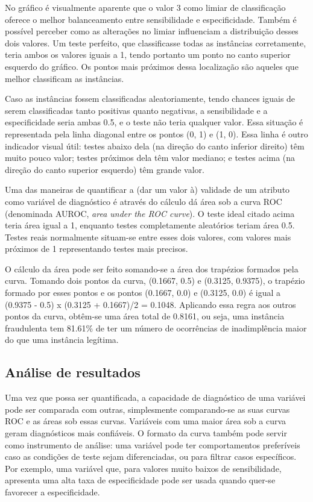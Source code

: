 No gráfico é visualmente aparente que o valor 3 como limiar de classificação oferece o melhor balanceamento entre sensibilidade e especificidade. Também é possível perceber como as alterações no limiar influenciam a distribuição desses dois valores. Um teste perfeito, que classificasse todas as instâncias corretamente, teria ambos os valores iguais a 1, tendo portanto um ponto no canto superior esquerdo do gráfico. Os pontos mais próximos dessa localização são aqueles que melhor classificam as instâncias.

Caso as instâncias fossem classificadas aleatoriamente, tendo chances iguais de serem classificadas tanto positivas quanto negativas, a sensibilidade e a especificidade seria ambas 0.5, e o teste não teria qualquer valor. Essa situação é representada pela linha diagonal entre os pontos (0, 1) e (1, 0). Essa linha é outro indicador visual útil: testes abaixo dela (na direção do canto inferior direito) têm muito pouco valor; testes próximos dela têm valor mediano; e testes acima (na direção do canto superior esquerdo) têm grande valor.

Uma das maneiras de quantificar a (dar um valor à) validade de um atributo como variável de diagnóstico é através do cálculo dá área sob a curva ROC (denominada AUROC, \emph{area under the ROC curve}). O teste ideal citado acima teria área igual a 1, enquanto testes completamente aleatórios teriam área 0.5. Testes reais normalmente situam-se entre esses dois valores, com valores mais próximos de 1 representando testes mais precisos.

O cálculo da área pode ser feito somando-se a área dos trapézios formados pela curva. Tomando dois pontos da curva, (0.1667, 0.5) e (0.3125, 0.9375), o trapézio formado por esses pontos e os pontos (0.1667, 0.0) e (0.3125, 0.0) é igual a (0.9375 - 0.5) x (0.3125 + 0.1667)/2 = 0.1048. Aplicando essa regra aos outros pontos da curva, obtêm-se uma área total de 0.8161, ou seja, uma instância fraudulenta tem 81.61\% de ter um número de ocorrências de inadimplência maior do que uma instância legítima.

\subsection{Análise de resultados}

Uma vez que possa ser quantificada, a capacidade de diagnóstico de uma variávei pode ser comparada com outras, simplesmente comparando-se as suas curvas ROC e as áreas sob essas curvas. Variáveis com uma maior área sob a curva geram diagnósticos mais confiáveis. O formato da curva também pode servir como instrumento de análise: uma variável pode ter comportamentos preferíveis caso as condições de teste sejam diferenciadas, ou para filtrar casos específicos. Por exemplo, uma variável que, para valores muito baixos de sensibilidade, apresenta uma alta taxa de especificidade pode ser usada quando quer-se favorecer a especificidade.

